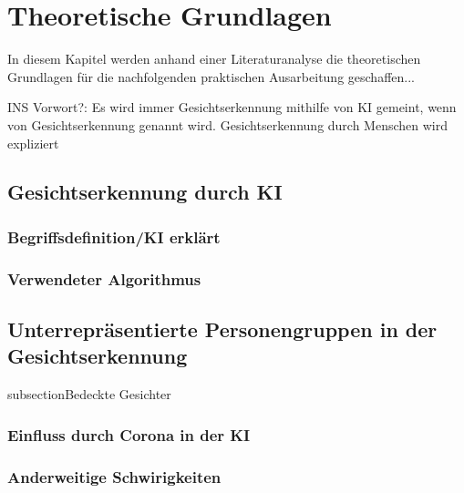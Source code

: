 \newpage
\section{Theoretische Grundlagen} \label{theorie}
In diesem Kapitel werden anhand einer Literaturanalyse die theoretischen Grundlagen für die nachfolgenden praktischen Ausarbeitung geschaffen...

INS Vorwort?: Es wird immer Gesichtserkennung mithilfe von KI gemeint, wenn von Gesichtserkennung genannt wird. Gesichtserkennung durch Menschen wird expliziert  
\subsection{Gesichtserkennung durch KI}
\subsubsection{Begriffsdefinition/KI erklärt}

\subsubsection{Verwendeter Algorithmus}

\subsection{Unterrepräsentierte Personengruppen in der Gesichtserkennung}

subsection{Bedeckte Gesichter}
\subsubsection{Einfluss durch Corona in der KI}

\subsubsection{Anderweitige Schwirigkeiten}